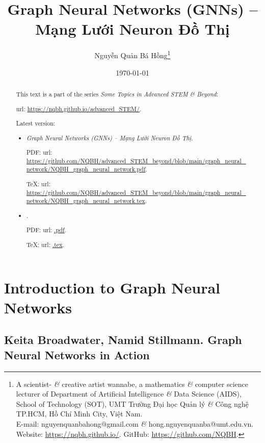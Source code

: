 \documentclass{article}
\title{Graph Neural Networks (GNNs) -- Mạng Lưới Neuron Đồ Thị}
\author{Nguyễn Quản Bá Hồng\footnote{A scientist- {\it\&} creative artist wannabe, a mathematics {\it\&} computer science lecturer of Department of Artificial Intelligence {\it\&} Data Science (AIDS), School of Technology (SOT), UMT Trường Đại học Quản lý {\it\&} Công nghệ TP.HCM, Hồ Chí Minh City, Việt Nam.\\E-mail: {\sf nguyenquanbahong@gmail.com} {\it\&} {\sf hong.nguyenquanba@umt.edu.vn}. Website: \url{https://nqbh.github.io/}. GitHub: \url{https://github.com/NQBH}.}}
\date{\today}
\begin{document}
\maketitle
\begin{abstract}
    This text is a part of the series {\it Some Topics in Advanced STEM \& Beyond}:

    {\sc url}: \url{https://nqbh.github.io/advanced_STEM/}.

    Latest version:
    \begin{itemize}
        \item {\it Graph Neural Networks (GNNs) -- Mạng Lưới Neuron Đồ Thị}.

        PDF: {\sc url}: \url{https://github.com/NQBH/advanced_STEM_beyond/blob/main/graph_neural_network/NQBH_graph_neural_network.pdf}.

        \TeX: {\sc url}: \url{https://github.com/NQBH/advanced_STEM_beyond/blob/main/graph_neural_network/NQBH_graph_neural_network.tex}.
        \item {\it }.

        PDF: {\sc url}: \url{.pdf}.

        \TeX: {\sc url}: \url{.tex}.
    \end{itemize}
\end{abstract}
\tableofcontents


\section{Introduction to Graph Neural Networks}


\subsection{{\sc Keita Broadwater, Namid Stillmann}. Graph Neural Networks in Action}
\end{document}
